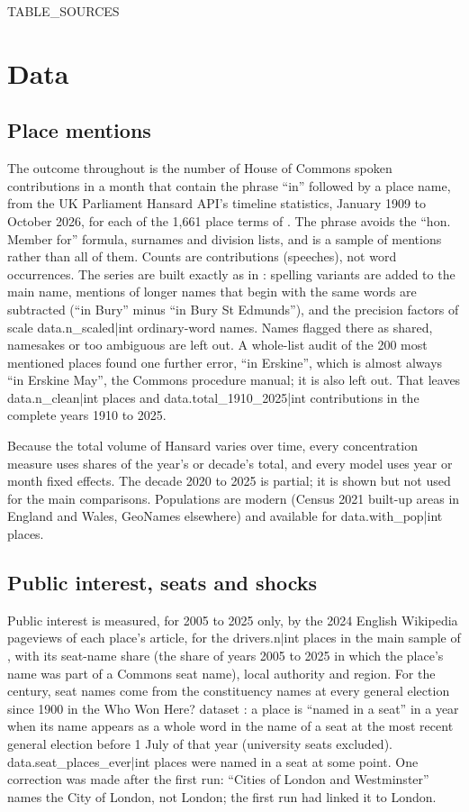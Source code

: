 \documentclass[11pt,a4paper]{article}
\begin{document}
{{TABLE_SOURCES}}

\section{Data}\label{sec:data}
\subsection{Place mentions}
The outcome throughout is the number of House of Commons spoken contributions in a month that contain the phrase ``in'' followed by a place name, from the UK Parliament Hansard API's timeline statistics, January 1909 to October 2026, for each of the 1,661 place terms of \citet{hotham2026a}. The phrase avoids the ``hon. Member for'' formula, surnames and division lists, and is a sample of mentions rather than all of them. Counts are contributions (speeches), not word occurrences. The series are built exactly as in \citet{hotham2026c}: spelling variants are added to the main name, mentions of longer names that begin with the same words are subtracted (``in Bury'' minus ``in Bury St Edmunds''), and the precision factors of \citet{hotham2026a} scale {{data.n_scaled|int}} ordinary-word names. Names flagged there as shared, namesakes or too ambiguous are left out. A whole-list audit of the 200 most mentioned places found one further error, ``in Erskine'', which is almost always ``in Erskine May'', the Commons procedure manual; it is also left out. That leaves {{data.n_clean|int}} places and {{data.total_1910_2025|int}} contributions in the complete years 1910 to 2025.

Because the total volume of Hansard varies over time, every concentration measure uses shares of the year's or decade's total, and every model uses year or month fixed effects. The decade 2020 to 2025 is partial; it is shown but not used for the main comparisons. Populations are modern (Census 2021 built-up areas in England and Wales, GeoNames elsewhere) and available for {{data.with_pop|int}} places.

\subsection{Public interest, seats and shocks}
Public interest is measured, for 2005 to 2025 only, by the 2024 English Wikipedia pageviews of each place's article, for the {{drivers.n|int}} places in the main sample of \citet{hotham2026b}, with its seat-name share (the share of years 2005 to 2025 in which the place's name was part of a Commons seat name), local authority and region. For the century, seat names come from the constituency names at every general election since 1900 in the Who Won Here? dataset \citep{hotham2026e}: a place is ``named in a seat'' in a year when its name appears as a whole word in the name of a seat at the most recent general election before 1 July of that year (university seats excluded). {{data.seat_places_ever|int}} places were named in a seat at some point. One correction was made after the first run: ``Cities of London and Westminster'' names the City of London, not London; the first run had linked it to London.
\end{document}
